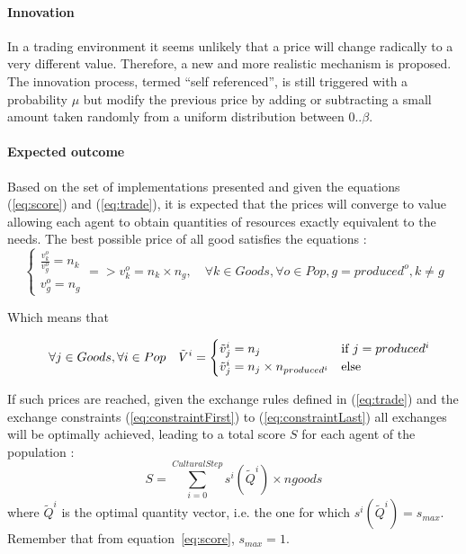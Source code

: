 \documentclass{wscpaperproc}
\begin{document}
\paragraph{Innovation} In a trading environment it seems unlikely that a price will change radically to a very different value. Therefore, a new and more realistic mechanism is proposed. The innovation process, termed ``self referenced'', is still triggered with a probability $\mu$ 
but modify the previous price by adding or subtracting a small amount taken randomly from a uniform  distribution between $0 .. \beta$.


\paragraph{Expected outcome} 

Based on the set of implementations presented and given the equations (\ref{eq:score}) and (\ref{eq:trade}), it is expected that the prices will converge to value allowing each agent to obtain quantities of resources exactly equivalent to the needs. The best possible price of all good satisfies the equations :
\begin{equation}
	\begin{cases}
		\frac{v^o_k}{v^o_g} = n_k \\
		v^o_g = n_g 
	\end{cases} =>v^o_k = n_k \times n_g, \quad \forall k \in Goods, \forall o \in Pop, g = produced^o, k \not= g 
\end{equation}

Which means that 

\begin{equation}
	\quad \forall j \in Goods, \forall i \in Pop \quad \tilde{V}^i = 
	\begin{cases}
		\tilde{v}^i_j = n_j & \text{if $ j=produced^i$}\\
		 \tilde{v}^i_j = n_j \times n_{produced^i} & \text{else}
	\end{cases}\label{eq:optimum}
\end{equation}


If such prices are reached, given the exchange rules defined in (\ref{eq:trade}) and the exchange constraints (\ref{eq:constraintFirst}) to (\ref{eq:constraintLast}) all exchanges will be optimally achieved, leading to a total score $S$ for each agent of the population : 
$$ S = \sum_{i=0}^{CulturalStep}  s^i(\tilde{Q}^i) \times ngoods $$ 
where $\tilde{Q}^i$ is the optimal quantity vector, i.e. the one for which $s^i(\tilde{Q}^i) = s_{max}$. Remember that from equation~\ref{eq:score}, $s_{max}=1$.
\end{document}
